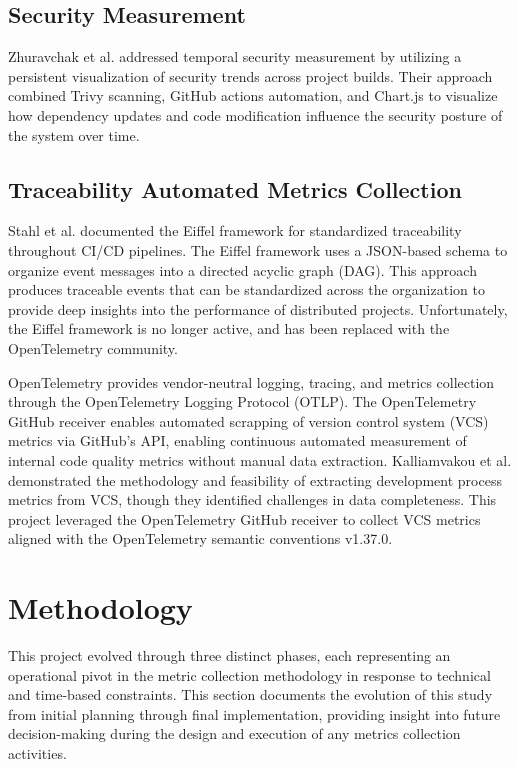 \documentclass[12pt]{article}
\begin{document}
\subsection{Security Measurement}

Zhuravchak et al. \cite{zhuravchak2025security} addressed temporal
security measurement by utilizing a persistent visualization of security
trends across project builds. Their approach combined Trivy scanning,
GitHub actions automation,
and Chart.js to visualize how dependency updates and code modification influence
the security posture of the system over time.

\subsection{Traceability Automated Metrics Collection}

Stahl et al. \cite{stahl2016continuous} documented the Eiffel
framework for standardized traceability throughout CI/CD pipelines.
The Eiffel framework
uses a JSON-based schema to organize event messages into a directed
acyclic graph (DAG). This
approach produces traceable events that can be standardized across
the organization to provide
deep insights into the performance of distributed projects.
Unfortunately, the Eiffel framework is no
longer active, and has been replaced with the OpenTelemetry community.

OpenTelemetry \cite{opentelemetry2021} provides vendor-neutral
logging, tracing, and metrics collection
through the OpenTelemetry Logging Protocol (OTLP). The OpenTelemetry
GitHub receiver
\cite{opentelemetry-github-receiver} enables automated scrapping of
version control system (VCS) metrics via GitHub's API, enabling
continuous automated measurement of
internal code quality metrics without manual data extraction.
Kalliamvakou et al.
\cite{kalliamvakou2014promises} demonstrated the methodology and
feasibility of extracting
development process metrics from VCS, though they identified
challenges in data completeness.
This project leveraged the OpenTelemetry GitHub receiver to collect
VCS metrics aligned with the OpenTelemetry
semantic conventions v1.37.0.

\section{Methodology}

This project evolved through three distinct phases, each representing an
operational pivot in the metric collection methodology in response to technical
and time-based constraints. This section documents the evolution of this study
from initial planning through final implementation, providing insight
into future decision-making during the design and execution of any metrics
collection activities.
\end{document}

